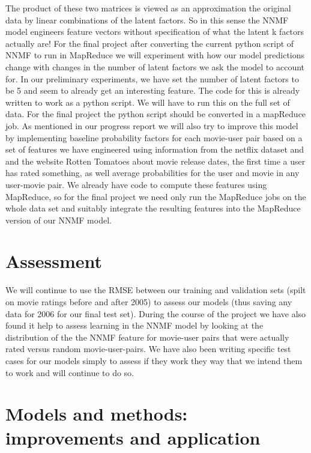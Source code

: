 \documentclass[11pt]{article}
\begin{document}
The product of these two matrices is viewed as an approximation the
original data by linear combinations of the latent factors. So in this
sense the NNMF model engineers feature vectors without specification
of what the latent k factors actually are! For the final project after
converting the current python script of NNMF to run in MapReduce we
will experiment with how our model predictions change with changes in
the number of latent factors we ask the model to account for. In our
preliminary experiments, we have set the number of latent factors to
be 5 and seem to already get an interesting feature. The code for this
is already written to work as a python script. We will have to run
this on the full set of data. For the final project the python script
should be converted in a mapReduce job.  As mentioned in our progress
report we will also try to improve this model by implementing baseline
probability factors for each movie-user pair based on a set of
features we have engineered using information from the netflix dataset
and and the website Rotten Tomatoes about movie release dates, the
first time a user has rated something, as well average probabilities
for the user and movie in any user-movie pair. We already have code to
compute these features using MapReduce, so for the final project we
need only run the MapReduce jobs on the whole data set and suitably
integrate the resulting features into the MapReduce version of our
NNMF model.

\section{Assessment}

We will continue to use the RMSE between our training and validation
sets (spilt on movie ratings before and after 2005) to assess our
models (thus saving any data for 2006 for our final test set). During
the course of the project we have also found it help to assess
learning in the NNMF model by looking at the distribution of the the
NNMF feature for movie-user pairs that were actually rated versus
random movie-user-pairs. We have also been writing specific test cases
for our models simply to assess if they work they way that we intend
them to work and will continue to do so.


\section{Models and methods: improvements and application}
\end{document}
